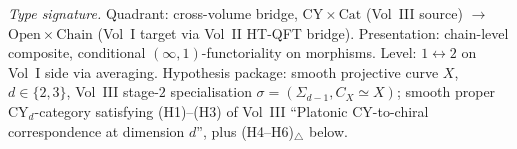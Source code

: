 \begin{theorem}
\label{thm:hdm-triangle-composite}
\emph{Type signature.} Quadrant: cross-volume bridge,
$\mathrm{CY}\!\times\!\mathrm{Cat}$ (Vol~III source) $\to$
$\mathrm{Open}\!\times\!\mathrm{Chain}$ (Vol~I target via Vol~II
HT-QFT bridge). Presentation: chain-level composite, conditional
$(\infty,1)$-functoriality on morphisms. Level: $1\leftrightarrow 2$
on Vol~I side via averaging. Hypothesis package: smooth projective
curve $X$, $d\in\{2,3\}$, Vol~III stage-$2$ specialisation
$\sigma=(\Sigma_{d-1}, C_X\simeq X)$; smooth proper CY$_d$-category
satisfying \textup{(H1)--(H3)} of Vol~III ``Platonic CY-to-chiral
correspondence at dimension $d$'', plus \textup{(H4--H6)$_\triangle$}
below.


\end{theorem}
